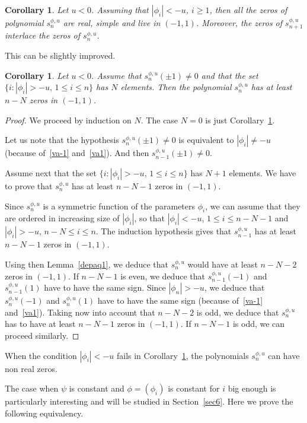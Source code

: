 \documentclass[10pt, a4paper, leqno]{amsart}
\numberwithin{equation}{section}
\theoremstyle{plain}
\newtheorem{Cor}[Theo]{Corollary}
\theoremstyle{remark}
\newcommand{\spu}{s^{\phi,u}}
\begin{document}
\begin{Cor}
\label{ptc2}
Let $u<0$. Assuming that $|\phi_i| < -u$, $i\ge 1$, then all the zeros of polynomial $\spu_n$ are real, simple and live in $(-1,1)$. Moreover, the zeros of $s_{n+1}^{\phi,u}$ interlace the zeros of $\spu_n$.
\end{Cor}

This can be slightly improved.

\begin{Cor}
\label{ptc3}
Let $u<0$. Assume that $\spu_n (\pm 1) \ne 0$ and that the set $\{i:|\phi_i|> -u,\, 1\le i\le n\}$ has $N$ elements. Then the polynomial $\spu_n$ has at least $n-N$ zeros in $(-1,1)$.
\end{Cor}

\begin{proof}
We proceed by induction on $N$. The case $N=0$ is just Corollary~\ref{ptc2}.

Let us note that the hypothesis $\spu_n (\pm 1) \ne 0$ is equivalent to $|\phi_i| \ne -u$ (because of~\eqref{va-1} and~\eqref{va1}). And then $\spu_{n-1} (\pm 1) \ne 0$.

Assume next that the set $\{i:|\phi_i|> -u,\, 1\le i\le n\}$ has $N+1$ elements. We have to prove that $\spu_n$ has at least $n-N-1$ zeros in $(-1,1)$.

Since $\spu_n$ is a symmetric function of the parameters $\phi_i$, we can assume that they are ordered in increasing size of $|\phi_i|$, so that
$|\phi_i|< -u$, $1\le i\le n-N-1$ and $|\phi_i|> -u$, $n-N\le i\le n$.
The induction hypothesis gives that $\spu_{n-1}$ has at least $n-N-1$ zeros in $(-1,1)$.

Using then Lemma~\ref{depaq1}, we deduce that $\spu_{n}$ would have at least $n-N-2$ zeros in $(-1,1)$.
If $n-N-1$ is even, we deduce that $\spu_{n-1}(-1)$ and $\spu_{n-1}(1)$ have to have the same sign.
Since $|\phi_n|> -u$, we deduce that $\spu_{n}(-1)$ and $\spu_{n}(1)$ have to have the same sign (because of~\eqref{va-1} and~\eqref{va1}). Taking now into account that
$n-N-2$ is odd, we deduce that $\spu_n$ has to have at least $n-N-1$ zeros in $(-1,1)$. If $n-N-1$ is odd, we can proceed similarly.
\end{proof}

When the condition $|\phi_i| < -u$ fails in Corollary~\ref{ptc2}, the polynomials $\spu_n$ can have non real zeros.

The case when $\psi$ is constant and $\phi=(\phi_i)$ is constant for $i$ big enough is particularly interesting and will be studied in Section~\ref{sec6}. Here we prove the following equivalency.
\end{document}
